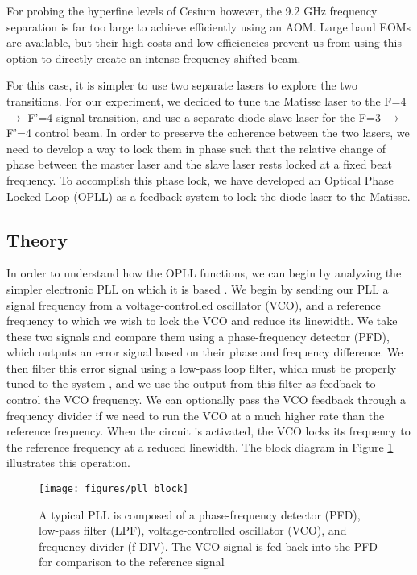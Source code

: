 For probing the hyperfine levels of Cesium however, the 9.2 GHz frequency separation is far too large to achieve efficiently using an AOM.  Large band EOMs are
available, but their high costs and low efficiencies prevent us from using this
option to directly create an intense frequency shifted beam.

For this case, it is simpler to use two separate lasers to explore the two transitions.  For our experiment, we decided to tune the Matisse laser to the F=4 $\to$ F'=4 signal transition, and use a separate diode slave laser for the F=3 $\to$ F'=4 control beam.  In order to preserve the coherence between the two lasers, we need to develop a way to lock them in phase such that the relative change of phase between the master laser and the slave laser rests locked at a fixed beat frequency.  To accomplish this phase lock, we have developed an Optical Phase Locked Loop (OPLL) as a feedback system to lock the diode laser to the Matisse.

\subsection{Theory} 
 
In order to understand how the OPLL functions, we can begin by analyzing the
simpler electronic PLL on which it is based \cite{curtin1999phase3}.  We begin
by sending our PLL a signal frequency from a voltage-controlled oscillator
(VCO), and a reference frequency to which we wish to lock the VCO and reduce its linewidth.  We take these two signals and compare them using a phase-frequency detector (PFD), which outputs an error signal based on their phase and frequency difference.  We then filter this error signal using a low-pass loop filter, which must be properly tuned to the system \cite{abramovitch2002phase}, and we use the output from this filter as feedback to control the VCO frequency.  We can optionally pass the VCO feedback through a frequency divider if we need to run the VCO at a much higher rate than the reference frequency.  When the circuit is activated, the VCO locks its frequency to the reference frequency at a reduced linewidth.  The block diagram in Figure \ref{fig:pll_block}  illustrates this operation.

\begin{figure}[!htb] 
 \centering 
 \texttt{[image: figures/pll\_block]} 
 \caption[PLL block diagram]{A typical PLL is composed of a phase-frequency detector (PFD), low-pass filter (LPF), voltage-controlled oscillator (VCO), and frequency divider (f-DIV).  The VCO signal is fed back into the PFD for comparison to the reference signal} 
 \label{fig:pll_block} 
\end{figure}
 
